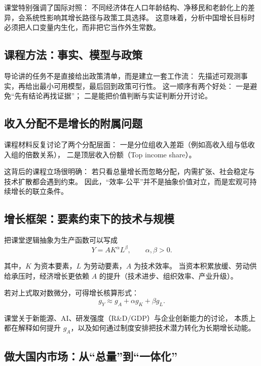 \documentclass[UTF8,11pt,a4paper]{ctexart}
\begin{document}
课堂特别强调了国际对照：
不同经济体在人口年龄结构、净移民和老龄化上的差异，会系统性影响其增长路径与政策工具选择。
这意味着，分析中国增长目标时必须把人口变量内生化，而非把它当作外生常数。

\subsection{课程方法：事实、模型与政策}

导论讲的任务不是直接给出政策清单，而是建立一套工作流：
先描述可观测事实，再给出最小可用模型，最后回到政策可行性。
这一顺序有两个好处：
一是避免“先有结论再找证据”；
二是能把价值判断与实证判断分开讨论。

\subsection{收入分配不是增长的附属问题}

课程材料反复讨论了两个分配层面：
一是分位组收入差距（例如高收入组与低收入组的倍数关系），
二是顶层收入份额（Top income share）。

这背后的课程立场很明确：
若只看总量增长而忽略分配，内需扩张、社会稳定与技术扩散都会遇到约束。
因此，“效率-公平”并不是抽象价值对立，而是宏观可持续增长的联立条件。

\subsection{增长框架：要素约束下的技术与规模}

把课堂逻辑抽象为生产函数可以写成
\begin{equation}
  Y = A K^{\alpha} L^{\beta}, \qquad \alpha,\beta > 0.
\end{equation}

其中，$K$ 为资本要素，$L$ 为劳动要素，$A$ 为技术效率。
当资本积累放缓、劳动供给承压时，经济增长更依赖 $A$ 的提升（技术进步、组织效率、产业升级）。

若对上式取对数微分，可得增长核算形式：
\begin{equation}
  g_Y \approx g_A + \alpha g_K + \beta g_L.
\end{equation}

课堂关于新能源、AI、研发强度（R\&D/GDP）与企业创新能力的讨论，
本质上都在解释如何提升 $g_A$，以及如何通过制度安排把技术潜力转化为长期增长动能。

\subsection{做大国内市场：从“总量”到“一体化”}
\end{document}
